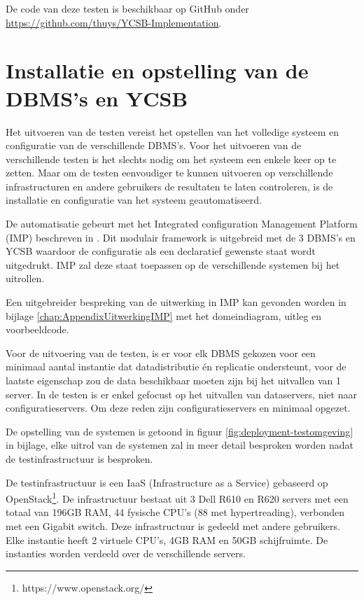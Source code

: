 De code van deze testen is beschikbaar op GitHub onder  \url{https://github.com/thuys/YCSB-Implementation}. 

\section{Installatie en opstelling van de DBMS's en YCSB}
Het uitvoeren van de testen vereist het opstellen van het volledige systeem en configuratie van de verschillende DBMS's. Voor het uitvoeren van de verschillende testen is het slechts nodig om het systeem een enkele keer op te zetten. Maar om de testen eenvoudiger te kunnen uitvoeren op verschillende infrastructuren en andere gebruikers de resultaten te laten controleren, is de installatie en configuratie van het systeem geautomatiseerd. 

De automatisatie gebeurt met het Integrated configuration Management Platform (IMP) beschreven in \cite{KULeuven-453199}. Dit modulair framework is uitgebreid met de 3 DBMS's en YCSB waardoor de configuratie als een declaratief gewenste staat wordt uitgedrukt. IMP zal deze staat toepassen op de verschillende systemen bij het uitrollen. 

Een uitgebreider bespreking van de uitwerking in IMP kan gevonden worden in bijlage \ref{chap:AppendixUitwerkingIMP} met het domeindiagram, uitleg en voorbeeldcode. 

Voor de uitvoering van de testen, is er voor elk DBMS gekozen voor een minimaal aantal instantie dat datadistributie én replicatie ondersteunt, voor de laatste eigenschap zou de data beschikbaar moeten zijn bij het uitvallen van 1 server. In de testen is er enkel gefocust op het uitvallen van dataservers, niet naar configuratieservers. Om deze reden zijn configuratieservers en minimaal opgezet. 

De opstelling van de systemen is getoond in figuur \ref{fig:deployment-testomgeving} in bijlage, elke uitrol van de systemen zal in meer detail besproken worden nadat de testinfrastructuur is besproken.  

De testinfrastructuur is een IaaS (Infrastructure as a Service) gebaseerd op OpenStack\footnote{https://www.openstack.org/}. De infrastructuur bestaat uit 3 Dell R610 en R620 servers met een totaal van 196GB RAM, 44 fysische CPU's (88 met hypertreading), verbonden met een Gigabit switch. Deze infrastructuur is gedeeld met andere gebruikers. Elke instantie heeft 2 virtuele CPU's, 4GB RAM en 50GB schijfruimte. De instanties worden verdeeld over de verschillende servers. 

